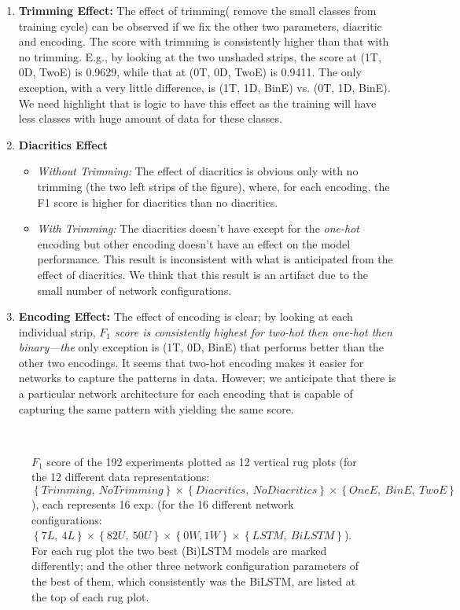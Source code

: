 \begin{enumerate}
\item \textbf{Trimming Effect:} The effect of trimming( remove the small classes from training cycle) can be observed if we fix the other two parameters, diacritic and encoding. The score with trimming is consistently higher than that with no trimming. E.g., by looking at the two unshaded strips, the score at (1T, 0D, TwoE) is 0.9629, while that at (0T, 0D, TwoE) is 0.9411. The only exception, with a very little difference, is (1T, 1D, BinE) vs. (0T, 1D, BinE). We need highlight that is logic to have this effect as the training will have less classes with huge amount of data for these classes.
\item \textbf{Diacritics Effect}
  \begin{itemize}
  \item \textit{Without Trimming:} The effect of diacritics is obvious only with no trimming (the two left strips of the figure), where, for each encoding, the F1 score is higher for diacritics than no diacritics.
    \item \textit{With Trimming:} The diacritics doesn't have except for the \textit{one-hot} encoding but other encoding doesn't have an effect on the model performance. This result is inconsistent with what is anticipated from the effect of diacritics. We think that this result is an artifact due to the small number of network configurations.

    \end{itemize} 
\item \textbf{Encoding Effect:} The effect of encoding is clear; by looking at each individual strip, \textit{$F_1$ score is consistently highest for two-hot then one-hot then binary—the} only exception is (1T, 0D, BinE) that performs better than the other two encodings. It seems that two-hot encoding makes it easier for networks to capture the patterns in data. However; we anticipate that there is a particular network architecture for each encoding that is capable of capturing the same pattern with yielding the same score.

  
  \end{enumerate}


  
\begin{figure}[!t]
 
 \caption{$F_1$ score of the 192 experiments plotted as 12 vertical rug plots (for the 12 different data representations: $\left\{\mathit{Trimming},\ \mathit{No Trimming} \right\} \times \left\{\mathit{Diacritics},\ \mathit{No Diacritics} \right\} \times \left\{\mathit{OneE},\ \mathit{BinE},\ \mathit{TwoE}\right\}$), each represents 16 exp. (for the 16 different network configurations: $\left\{7L,\ 4L\right\} \times \left\{82U,\ 50U\right\} \times \left\{0W, 1W\right\} \times \left\{LSTM,\ BiLSTM\right\}$). For each rug plot the two best (Bi)LSTM models are marked differently; and the other three network configuration parameters of the best of them, which consistently was the BiLSTM, are listed at the top of each rug plot.}~\label{fig:ArabicModelsResults}
\end{figure}

